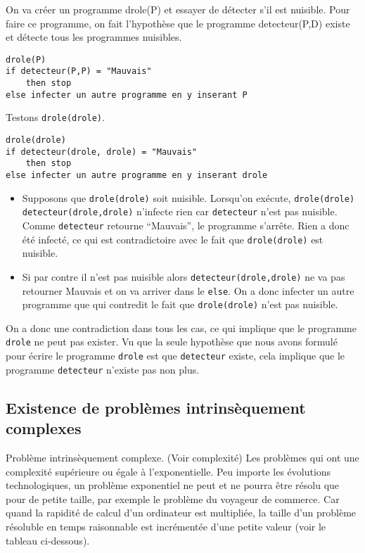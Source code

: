 On va créer un programme drole(P) et essayer de détecter s’il est nuisible. Pour faire ce programme, on fait l'hypothèse que le programme detecteur(P,D) existe et détecte tous les programmes nuisibles.

\begin{lstlisting}
drole(P)
if detecteur(P,P) = "Mauvais"
	then stop
else infecter un autre programme en y inserant P
\end{lstlisting}

Testons \lstinline|drole(drole)|.
\begin{lstlisting}
drole(drole)
if detecteur(drole, drole) = "Mauvais"
	then stop
else infecter un autre programme en y inserant drole
\end{lstlisting}

\begin{itemize}
	\item Supposons que \lstinline|drole(drole)| soit nuisible.
      Lorsqu'on exécute, \lstinline|drole(drole)|
      \lstinline|detecteur(drole,drole)| n'infecte rien car \lstinline|detecteur| n'est pas nuisible.
      Comme \lstinline|detecteur| retourne ``Mauvais'',
      le programme s'arrête.
      Rien a donc été infecté, ce qui est contradictoire avec le fait que \lstinline|drole(drole)| est nuisible.
	\item Si par contre il n'est pas nuisible alors \lstinline|detecteur(drole,drole)|
      ne va pas retourner Mauvais et on va arriver dans le \lstinline|else|.
      On a donc infecter un autre programme que qui contredit le fait que \lstinline|drole(drole)| n'est pas nuisible.
\end{itemize}

On a donc une contradiction dans tous les cas, ce qui implique que le programme \lstinline|drole| ne peut pas
exister. Vu que la seule hypothèse que nous avons formulé pour écrire le programme \lstinline|drole| est que \lstinline|detecteur| existe, 
cela implique que le programme \lstinline|detecteur| n'existe pas non plus.

\subsection{ Existence de problèmes intrinsèquement complexes}
\label{subsec:existence_de_problemes_intrinsequement_complexes}

Problème intrinsèquement complexe. (Voir complexité) Les problèmes
qui ont une complexité supérieure ou égale à l'exponentielle. Peu importe les évolutions technologiques, un problème exponentiel ne peut et ne pourra être résolu que pour de petite taille, par exemple le problème du voyageur de commerce. Car quand la rapidité de calcul d'un ordinateur est multipliée, la taille d'un problème résoluble en temps raisonnable est incrémentée d'une petite valeur (voir le tableau ci-dessous).
	
